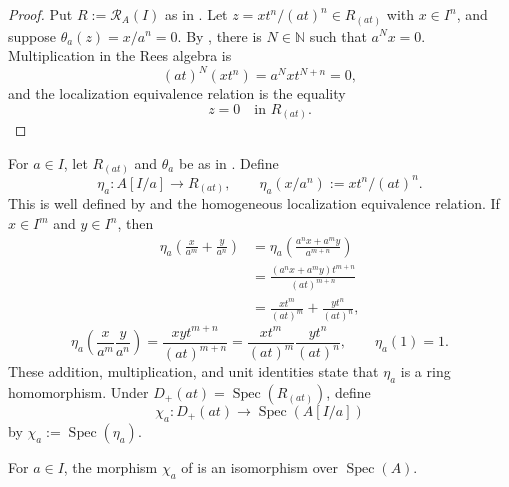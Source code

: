 \begin{proof}
  Put $R:=\mathcal R_A(I)$ as in
  .  Let
  $z=xt^n/(at)^n\in R_{(at)}$ with $x\in I^n$, and suppose
  $\theta_a(z)=x/a^n=0$.  By
  , there is
  $N\in\mathbb N$ such that $a^Nx=0$.  Multiplication in the Rees algebra is
  \[
    (at)^N(xt^n)=a^Nxt^{N+n}=0,
  \]
  and the localization equivalence relation is the equality
  \[
    z=0\quad\text{in }R_{(at)}.
  \]
\end{proof}

\begin{definition}
  \label{def:nagata-affine-blowup-chart-map}

  For $a\in I$, let $R_{(at)}$ and $\theta_a$ be as in
  .  Define
  \[
    \eta_a\colon A[I/a]\longrightarrow R_{(at)},
    \qquad \eta_a(x/a^n):=xt^n/(at)^n.
  \]
  This is well defined by
   and the homogeneous
  localization equivalence relation.  If $x\in I^m$ and $y\in I^n$, then
  \[
  \begin{aligned}
    \eta_a\left(\frac{x}{a^m}+\frac{y}{a^n}\right)
      &=\eta_a\left(\frac{a^nx+a^my}{a^{m+n}}\right)\\
      &=\frac{(a^nx+a^my)t^{m+n}}{(at)^{m+n}}\\
      &=\frac{xt^m}{(at)^m}+\frac{yt^n}{(at)^n},
  \end{aligned}
  \]
  \[
    \eta_a\left(\frac{x}{a^m}\frac{y}{a^n}\right)
      =\frac{xyt^{m+n}}{(at)^{m+n}}
      =\frac{xt^m}{(at)^m}\frac{yt^n}{(at)^n},
    \qquad \eta_a(1)=1.
  \]
  These addition, multiplication, and unit identities state that
  $\eta_a$ is a ring homomorphism.  Under
  $D_+(at)=\operatorname{Spec}(R_{(at)})$, define
  \[
    \chi_a\colon D_+(at)\longrightarrow\operatorname{Spec}(A[I/a])
  \]
  by $\chi_a:=\operatorname{Spec}(\eta_a)$.
\end{definition}

\begin{proposition}
  \label{prop:nagata-affine-blowup-chart}

  For $a\in I$, the morphism $\chi_a$ of
   is an
  isomorphism over
  $\operatorname{Spec}(A)$.
\end{proposition}

